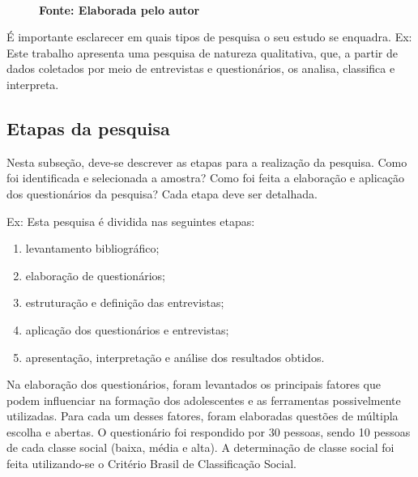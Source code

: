 \begin{figure}[H]
\begin{adjustbox}{valign=c}
{}
\end{adjustbox}
	\vspace{.1cm}  %
	\\\textbf{\footnotesize Fonte: Elaborada pelo autor}  
 \label{fig:metodologia}
\end{figure}

É importante esclarecer em quais tipos de pesquisa o seu estudo se enquadra.
Ex: Este trabalho apresenta uma pesquisa de natureza qualitativa, que, a partir de dados coletados por meio de entrevistas e questionários, os analisa, classifica e interpreta.

\subsection{\esp Etapas da pesquisa}

	Nesta subseção, deve-se descrever as etapas para a realização da pesquisa. Como foi identificada e selecionada a amostra? Como foi feita a elaboração e aplicação dos questionários da pesquisa? Cada etapa deve ser detalhada.

\newpage
Ex: Esta pesquisa é dividida nas seguintes etapas:

\begin{enumerate}
\item levantamento bibliográfico;
\item elaboração de questionários;
\item estruturação e definição das entrevistas;
\item aplicação dos questionários e entrevistas;
\item apresentação, interpretação e análise dos resultados obtidos.
\end{enumerate}

Na elaboração dos questionários, foram levantados os principais fatores que podem influenciar na formação dos adolescentes e as ferramentas possivelmente utilizadas. Para cada um desses fatores, foram elaboradas questões de múltipla escolha e abertas. O questionário foi respondido por 30 pessoas, sendo 10 pessoas de cada classe social (baixa, média e alta). A determinação de classe social foi feita utilizando-se o Critério Brasil de Classificação Social.


